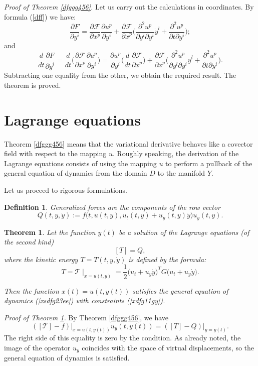 \documentclass[reqno,12pt]{amsproc}
\newtheorem{theo}{Theorem}
\newtheorem{df}{Definition}
\begin{document}
{\it Proof of Theorem \ref{dfggg456}.} Let us carry out the calculations in coordinates. By formula (\ref{dff}) we have:
$$\frac{\partial F}{\partial y^i}=\frac{\partial \mathscr{F}}{\partial x^p}\frac{\partial u^p}{\partial y^i}+
\frac{\partial \mathscr{F}}{\partial \dot x^p}\Big(\frac{\partial^2 u^p}{\partial y^l\partial y^i}\dot y^l+\frac{\partial^2u^p}{\partial t\partial y^i}\Big);$$
and
$$
\frac{d}{dt}\frac{\partial F}{\partial \dot y^i}=\frac{d}{dt}\Big(\frac{\partial \mathscr{F}}{\partial \dot x^p}
\frac{\partial u^p}{\partial y^i}\Big)=\frac{\partial u^p}{\partial y^i}\Big(\frac{d}{dt}\frac{\partial \mathscr{F}}{\partial \dot x^p}\Big)+\frac{\partial \mathscr{F}}{\partial \dot x^p}\Big(\frac{\partial^2 u^p}{\partial y^l\partial y^i}\dot y^l+\frac{\partial^2u^p}{\partial t\partial y^i}\Big).$$
Subtracting one equality from the other, we obtain the required result.
The theorem is proved.




\section{Lagrange equations}\label{cbbbbb}
Theorem \ref{dfggg456} means that the variational derivative behaves like a covector field with respect to the mapping $u$.
Roughly speaking, the derivation of the Lagrange equations consists of using the mapping $u$ to perform a pullback of the general equation of dynamics from the domain $D$ to the manifold $Y$.

Let us proceed to rigorous formulations.

\begin{df}Generalized forces are the components of the row vector
\begin{equation}\label{sfg40}Q(t,y,\dot y):=f\big(t,u(t,y),u_t(t,y)+u_y(t,y)\dot y\big) u_y(t,y).\end{equation}
\end{df}
\begin{theo}\label{xsfgtyuio}
Let the function $y(t)$ be a solution of the Lagrange equations (of the second kind)
\begin{equation}\label{sdfgqas}[T]=Q,\end{equation}
where the kinetic energy $T=T(t,y,\dot y)$ is defined by the formula:
\begin{equation}\label{xdfsgggtyu}
T=\mathscr T\mid_{x=u(t,y)}=
\frac{1}{2}\big(u_t+u_y\dot y\big)^TG\big(u_t+u_y\dot y\big).
\end{equation}

Then the function $x(t)=u(t,y(t))$ satisfies the general equation of dynamics (\ref{xsdfg23ee}) with constraints (\ref{xdfg11gy}).\end{theo}
{\it Proof of Theorem \ref{xsfgtyuio}.} By Theorem \ref{dfggg456}, we have
\begin{equation}\label{xdfg6yiii}([\mathscr{T}]-f)\Big|_{x=u(t,y(t))}u_y(t,y(t))=([T]-Q)\Big|_{y=y(t)}.\end{equation}
The right side of this equality is zero by the condition. As already noted, the image of the operator $u_y$ coincides with the space of virtual displacements, so the general equation of dynamics is satisfied.
\end{document}

